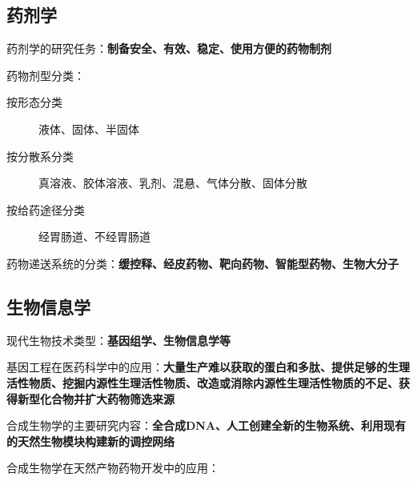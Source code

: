 \subsection{药剂学}%
\label{sub:复习：药剂学}
\begin{notation}
    药剂学的研究任务：\textbf{制备安全、有效、稳定、使用方便的药物制剂}
\end{notation}
\begin{notation}
    药物剂型分类：
    \begin{description}
        \item[按形态分类] 液体、固体、半固体
        \item [按分散系分类] 真溶液、胶体溶液、乳剂、混悬、气体分散、固体分散
        \item [按给药途径分类] 经胃肠道、不经胃肠道
    \end{description}
\end{notation}
\begin{notation}
    药物递送系统的分类：\textbf{缓控释、经皮药物、靶向药物、智能型药物、生物大分子}
\end{notation}
\subsection{生物信息学}%
\label{sub:复习：生物信息学}
\begin{notation}
    现代生物技术类型：\textbf{基因组学、生物信息学等}
\end{notation} 
\begin{notation}
    基因工程在医药科学中的应用：\textbf{大量生产难以获取的蛋白和多肽、提供足够的生理活性物质、挖掘内源性生理活性物质、改造或消除内源性生理活性物质的不足、获得新型化合物并扩大药物筛选来源}
\end{notation}
\begin{notation}
    合成生物学的主要研究内容：\textbf{全合成DNA、人工创建全新的生物系统、利用现有的天然生物模块构建新的调控网络}

    合成生物学在天然产物药物开发中的应用：
\end{notation}
